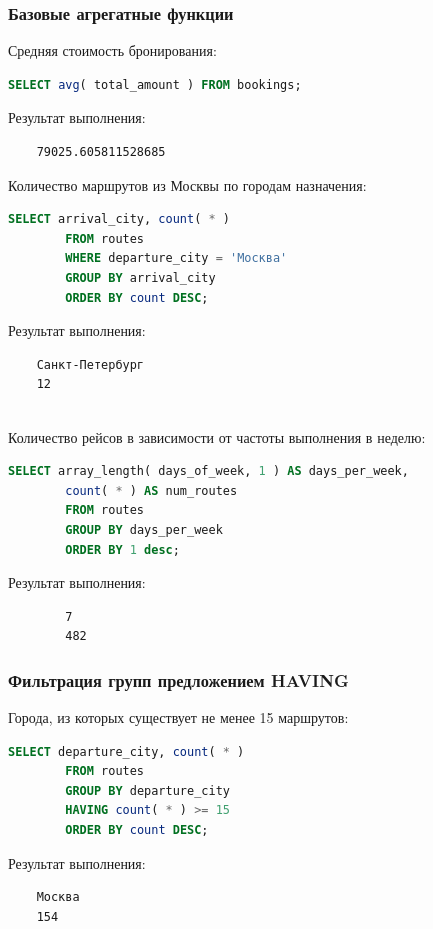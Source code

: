 \documentclass{bmstu-sob}
\begin{document}
	\subsubsection{Базовые агрегатные функции}
	Средняя стоимость бронирования:
	\begin{lstlisting}[language=SQL]
		SELECT avg( total_amount ) FROM bookings;
	\end{lstlisting}
	Результат выполнения:
	\begin{lstlisting}
	79025.605811528685
	\end{lstlisting}
	
	Количество маршрутов из Москвы по городам назначения:
	\begin{lstlisting}[language=SQL]
		SELECT arrival_city, count( * )
		FROM routes
		WHERE departure_city = 'Москва'
		GROUP BY arrival_city
		ORDER BY count DESC;
	\end{lstlisting}
	Результат выполнения:
	\begin{lstlisting}
	Санкт-Петербург
	12
	
	\end{lstlisting}
	
	Количество рейсов в зависимости от частоты выполнения в неделю:
	\begin{lstlisting}[language=SQL]
		SELECT array_length( days_of_week, 1 ) AS days_per_week,
		count( * ) AS num_routes
		FROM routes
		GROUP BY days_per_week
		ORDER BY 1 desc;
	\end{lstlisting}
	Результат выполнения:
	\begin{lstlisting}
		7
		482
	\end{lstlisting}
	
	\subsubsection{Фильтрация групп предложением HAVING}
	Города, из которых существует не менее 15 маршрутов:
	\begin{lstlisting}[language=SQL]
		SELECT departure_city, count( * )
		FROM routes
		GROUP BY departure_city
		HAVING count( * ) >= 15
		ORDER BY count DESC;
	\end{lstlisting}
	Результат выполнения:
	\begin{lstlisting}
	Москва
	154
	
	\end{lstlisting}
	
\end{document}
